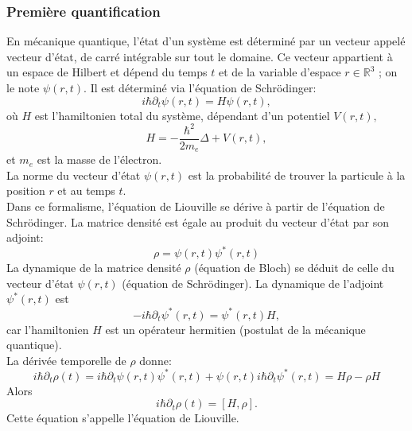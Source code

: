 \documentclass[12pt,a4paper,openany,oneside]{book}
\begin{document}
\subsubsection{Première quantiﬁcation} 
En mécanique quantique, l’état d’un système est déterminé par un vecteur appelé vecteur d’état, de carré intégrable sur tout le domaine. Ce vecteur appartient à un espace de Hilbert et dépend du temps $ t $ et de la variable d’espace $ r \in \mathbb{R}^{3} $ ; on le note $ \psi(r,t)$. Il est déterminé via l’équation de Schrödinger:
\begin{equation}
i\hbar\partial_{t}\psi(r,t)=H\psi(r,t),
\end{equation} 
où $ H $  est l’hamiltonien total du système, dépendant d’un potentiel $ V (r, t),$
$$ H = -\dfrac{\hbar^{2}}{2m_{e}}\Delta + V (r, t), $$
%
et $ m_{e}$ est la masse de l’électron.\\
La norme du vecteur d’état $ \psi(r,t)$ est la probabilité de trouver la particule à la position
$ r $ et au temps $ t $.\\
Dans ce formalisme, l’équation de Liouville se dérive à partir de l’équation de Schrödinger. La matrice densité est égale au produit du vecteur d’état par son adjoint:
$$ \rho =\psi(r,t)\psi^{*}(r,t) $$
%
La dynamique de la matrice densité $\rho $ (équation de Bloch) se déduit de celle du vecteur
d’état $ \psi(r,t)$ (équation de Schrödinger). La dynamique de l’adjoint $ \psi^{*}(r,t) $ est
 $$ -i\hbar\partial_{t}\psi^{*}(r,t)=\psi^{*}(r,t)H, $$
car l’hamiltonien $ H $ est un opérateur hermitien (postulat de la mécanique quantique).\\
La dérivée temporelle de $ \rho $ donne:
$$
i\hbar\partial_{t}\rho(t)= i\hbar\partial_{t}\psi(r,t)\psi^{*}(r,t)+\psi(r,t)i\hbar\partial_{t}\psi^{*}(r,t) = H \rho - \rho H
$$
Alors 
\begin{equation}
i\hbar\partial_{t}\rho(t) = [H, \rho].
\end{equation}
%
Cette équation s’appelle l’équation de Liouville.
\end{document}
